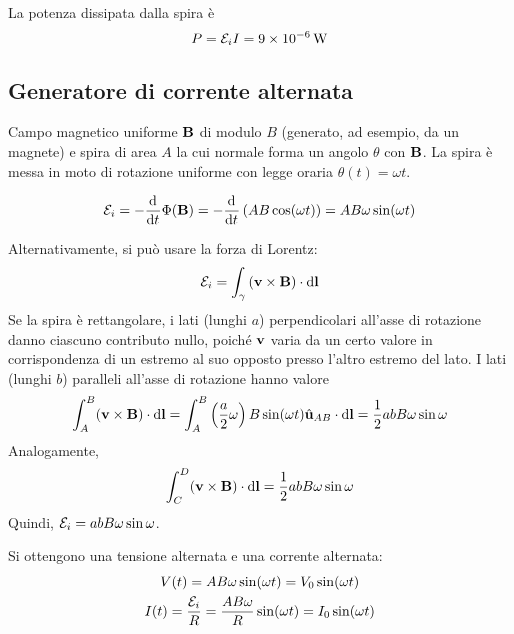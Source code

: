 La potenza dissipata dalla spira è
\begin{equation}
    P = \mathcal{E}_i I = \qty{9e-6}{\watt}
\end{equation}


\subsection{Generatore di corrente alternata}


Campo magnetico uniforme $\mathbf{B}$ di modulo $B$ (generato, ad esempio, da un magnete) e spira di area $A$ la cui normale forma un angolo $\theta$ con $\mathbf{B}$.
La spira è messa in moto di rotazione uniforme con legge oraria $\theta(t) = \omega t$.

\begin{equation}
    \fem_i = - \der{t} \Phi(\B)
    = - \der{t} \pts{A B \cos(\omega t)}
    = A B \omega \sin(\omega t)
\end{equation}

Alternativamente, si può usare la forza di Lorentz:
\begin{equation}
    \mathcal{E}_i = \int_\gamma \left( \mathbf{v} \times \mathbf{B} \right) \cdot \mathrm{d} \mathbf{l}
\end{equation}
Se la spira è rettangolare, i lati (lunghi $a$) perpendicolari all'asse di rotazione danno ciascuno contributo nullo, poiché $\mathbf{v}$ varia da un certo valore in corrispondenza di un estremo al suo opposto presso l'altro estremo del lato.
I lati (lunghi $b$) paralleli all'asse di rotazione hanno valore
\begin{equation}
    \int_A^B (\mathbf{v} \times \mathbf{B}) \cdot \mathrm{d} \mathbf{l}
    = \int_A^B \left( \frac{a}{2}\omega \right) B \sin(\omega t) \hat{\mathbf{u}}_{AB} \cdot \mathrm{d} \mathbf{l}
    = \frac{1}{2} abB \omega \sin\omega
\end{equation}
Analogamente,
\begin{equation}
    \int_C^D (\mathbf{v} \times \mathbf{B}) \cdot \mathrm{d} \mathbf{l}
    = \frac{1}{2} abB \omega \sin\omega
\end{equation}
Quindi, $\mathcal{E}_i = abB \omega \sin\omega$.

Si ottengono una tensione alternata e una corrente alternata:
\begin{subequations}
\begin{gather}
    V(t) = A B \omega \sin(\omega t) = V_0 \sin(\omega t) \\
    I(t) = \frac{\mathcal{E}_i}{R} = \frac{AB \omega}{R} \sin(\omega t) = I_0 \sin(\omega t)
\end{gather}
\end{subequations}

